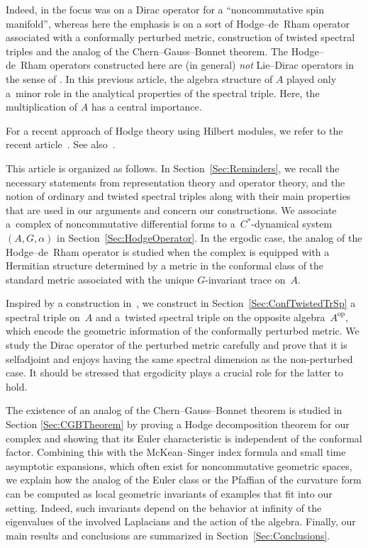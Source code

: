 \documentclass[pdftex]{sigma}
\numberwithin{equation}{section}
\begin{document}
Indeed, in \cite{TrSpLieGpGG} the focus was on a Dirac operator for a ``noncommutative spin manifold'', whereas here
the emphasis is on a sort of Hodge--de~Rham operator associated with a conformally perturbed metric, construction of twisted spectral triples and the analog of the Chern--Gauss--Bonnet theorem. The Hodge--de~Rham operators constructed here are (in general) \emph{not} Lie--Dirac operators in the sense of \cite{TrSpLieGpGG}. In this previous article, the algebra structure of $A$ played only a~minor role in the analytical properties of the spectral triple. Here, the multiplication of $A$ has a central importance.

For a recent approach of Hodge theory using Hilbert modules, we refer to the recent ar\-tic\-le~\cite{EllipticComplexKrysl}.
See also~\cite{HodgeTheoryEllipticKrysl, HodgeTheoryKrysl}.

This article is organized as follows. In Section~\ref{Sec:Reminders},
we recall the necessary statements from representation theory and
operator theory, and the notion of ordinary and twisted spectral
triples along with their main properties that are used in our arguments
and concern our constructions. We associate a~complex of noncommutative dif\/ferential forms to a~$C^*$-dynamical system
$(A, G, \alpha)$ in Section~\ref{Sec:HodgeOperator}. In the ergodic case,
the analog of the Hodge--de~Rham operator is studied when the complex is equipped with
a Hermitian structure determined by a metric in the conformal class
of the standard metric associated with the unique $G$-invariant
trace on~$A$.

Inspired by a construction in~\cite{GaussBonnet-ConnesTretkoff},
we construct in Section~\ref{Sec:ConfTwistedTrSp} a spectral triple on~$A$
and a~twisted spectral triple
on the opposite algebra~$A^\text{op}$, which encode the geometric
information of the conformally perturbed metric. We study the
Dirac operator of the perturbed metric carefully and prove that
it is selfadjoint and enjoys having the same spectral dimension
as the non-perturbed case. It should be stressed that ergodicity
plays a crucial role for the latter to hold.

The existence of an analog of the Chern--Gauss--Bonnet theorem
is studied in Section \ref{Sec:CGBTheorem} by proving a
Hodge decomposition theorem for our complex and showing
that its Euler characteristic is independent of the conformal
factor. Combining this with the McKean--Singer index formula
and small time asymptotic expansions, which often exist for
noncommutative geometric spaces, we explain how the
analog of the Euler class or the Pfaf\/f\/ian of the curvature
form can be computed as local geometric invariants of
examples that f\/it into our setting. Indeed, such invariants
depend on the behavior at inf\/inity of the eigenvalues of the
involved Laplacians and the action of the algebra. Finally,
our main results and conclusions are summarized in
Section~\ref{Sec:Conclusions}.
\end{document}
